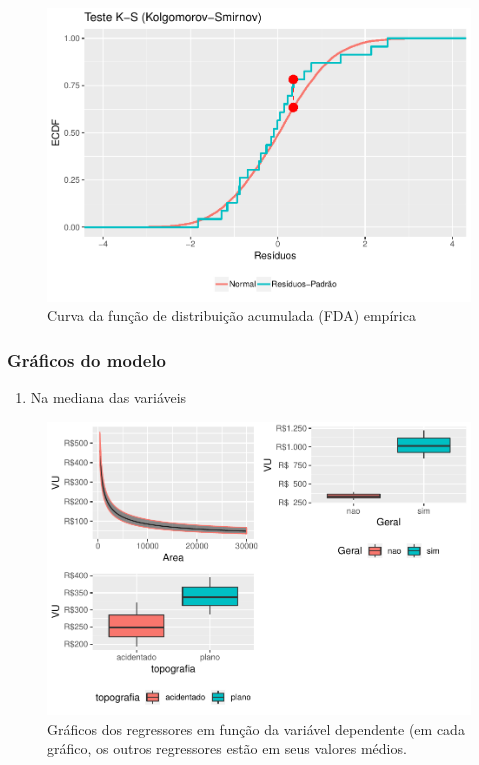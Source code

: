 \documentclass[]{article}
\providecommand{\tightlist}{%
  \setlength{\itemsep}{0pt}\setlength{\parskip}{0pt}}
\begin{document}
\begin{figure}[H]

{\centering \includegraphics[width=0.45\linewidth]{Report_files/figure-latex/KS-1} 

}

\caption{Curva da função de distribuição acumulada (FDA) empírica}\label{fig:KS}
\end{figure}

\newpage

\subsubsection{Gráficos do modelo}\label{graficos-do-modelo}

\begin{enumerate}
\def\labelenumi{\alph{enumi}.}
\tightlist
\item
  Na mediana das variáveis
\end{enumerate}

\begin{figure}[H]

{\centering \includegraphics[width=1\linewidth]{Report_files/figure-latex/unnamed-chunk-8-1} 

}

\caption{Gráficos dos regressores em função da variável dependente (em cada gráfico, os outros regressores estão em seus valores médios.}\label{fig:unnamed-chunk-8}
\end{figure}
\end{document}
